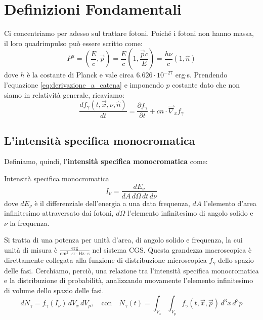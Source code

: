 \documentclass[11pt, a4paper, oneside]{scrreprt}
\begin{document}
\chapter{Definizioni Fondamentali}
Ci concentriamo per adesso sul trattare fotoni.
Poiché i fotoni non hanno massa, il loro quadrimpulso può essere scritto come:
\begin{equation} \label{quadrimpulso_fotone}
    P^{\mu} = \left(\frac{E}{c}, \vec{p}\right) = \frac{E}{c}\left(1, \frac{\vec{p}c}{E}\right) = \frac{h\nu}{c}(1, \hat{n})
\end{equation}
dove $h$ è la costante di Planck e vale circa $6.626 \cdot 10^{-27}$ erg$\cdot$s.
Prendendo l'equazione \eqref{eq:derivazione_a_catena} e imponendo $p$ costante dato che non siamo in relatività generale, ricaviamo:
\begin{equation} \label{eq:Boltzmann_fotoni}
    \frac{df_{\gamma}(t, \vec{x}, \nu, \hat{n})}{dt} = \frac{\partial f_{\gamma}}{\partial t} + c\hat{n} \cdot \vec{\nabla}_{x}f_{\gamma}
\end{equation} 

\section{L'intensità specifica monocromatica}
Definiamo, quindi, l'\textbf{intensità specifica monocromatica} come:

\begin{formulaBox}{Intensità specifica monocromatica}
\begin{equation} \label{eq:intensita_specifica_monocromatica}
    I_{\nu} = \frac{dE_\nu}{dA \, d\Omega \, dt \, d\nu}
\end{equation}
dove $dE_\nu$ è il differenziale dell'energia a una data frequenza, $dA$ l'elemento d'area infinitesimo attraversato dai fotoni, $d\Omega$ l'elemento infinitesimo di angolo solido e $\nu$ la frequenza. 
\end{formulaBox}

Si tratta di una potenza per unità d'area, di angolo solido e frequenza, la cui unità di misura è $\frac{\text{erg}}{\text{cm}^2 \cdot \text{sr} \cdot \text{Hz} \cdot \text{s}}$ nel sistema CGS.
Questa grandezza macroscopica è direttamente collegata alla funzione di distribuzione microscopica $f_{\gamma}$ dello spazio delle fasi.
Cerchiamo, perciò, una relazione tra l'intensità specifica monocromatica e la distribuzione di probabilità, analizzando nuovamente l'elemento infinitesimo di volume dello spazio delle fasi.
\begin{equation} \label{eq:pre_normalizzazione}
    dN_{\gamma} = f_{\gamma}(I_{\nu}) \, dV_x \, dV_p, \quad \text{con} \quad N_{\gamma}(t) = \int_{V_x} \int_{V_p} f_{\gamma}(t, \vec{x}, \vec{p}) \, d^3x \, d^3p
\end{equation}
\end{document}
